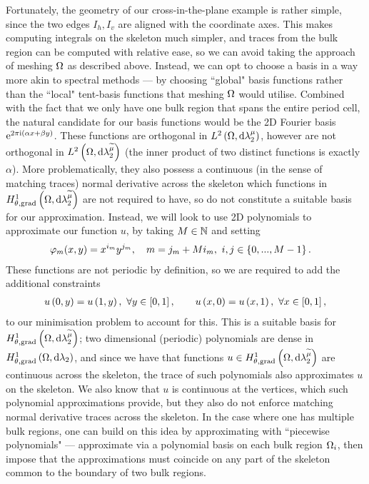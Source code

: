 Fortunately, the geometry of our cross-in-the-plane example is rather simple, since the two edges $I_h, I_v$ are aligned with the coordinate axes.
This makes computing integrals on the skeleton much simpler, and traces from the bulk region can be computed with relative ease, so we can avoid taking the approach of meshing $\Omega$ as described above.
Instead, we can opt to choose a basis in a way more akin to spectral methods --- by choosing ``global" basis functions rather than the ``local" tent-basis functions that meshing $\Omega$ would utilise.
Combined with the fact that we only have one bulk region that spans the entire period cell, the natural candidate for our basis functions would be the 2D Fourier basis $\mathrm{e}^{2\pi\mathrm{i}(\alpha x + \beta y)}$.
These functions are orthogonal in $L^{2}\left( \Omega,\mathrm{d} \lambda_2^{\mu} \right)$, however are not orthogonal in $L^{2}\left( \Omega,\mathrm{d} \lambda_2^{\widetilde{\mu}} \right)$ (the inner product of two distinct functions is exactly $\alpha$).
More problematically, they also possess a continuous (in the sense of matching traces) normal derivative across the skeleton which functions in $H^1_{\theta, \mathrm{grad}}\left( \Omega, \mathrm{d}\lambda_2^{\widetilde{\mu}} \right)$ are not required to have, so do not constitute a suitable basis for our approximation.
Instead, we will look to use 2D polynomials to approximate our function $u$, by taking $M\in\mathbb{N}$ and setting
\begin{align} \label{eq:2DPolyBasisDef}
	\varphi_m(x,y) &= x^{i_m} y^{j_m}, \quad m = j_m + Mi_m, \ i,j\in\clbracs{0,...,M-1}.
\end{align}
These functions are not periodic by definition, so we are required to add the additional constraints
\begin{align*}
	u\left( 0,y \right) = u\left( 1,y \right), \ \forall y\in\left[ 0,1 \right], 
	\qquad 
	u\left( x,0 \right) = u\left( x,1 \right), \ \forall x\in\left[ 0,1 \right],
\end{align*}
to our minimisation problem to account for this.
This is a suitable basis for $H^1_{\theta, \mathrm{grad}}\left( \Omega, \mathrm{d}\lambda_2^{\widetilde{\mu}} \right)$; two dimensional (periodic) polynomials are dense in $H^1_{\theta, \mathrm{grad}}\left( \Omega, \mathrm{d}\lambda_2 \right)$, and since we have that functions $u\in H^1_{\theta, \mathrm{grad}}\left( \Omega, \mathrm{d}\lambda_2^{\widetilde{\mu}} \right)$ are continuous across the skeleton, the trace of such polynomials also approximates $u$ on the skeleton.
We also know that $u$ is continuous at the vertices, which such polynomial approximations provide, but they also do not enforce matching normal derivative traces across the skeleton.
In the case where one has multiple bulk regions, one can build on this idea by approximating with ``piecewise polynomials" --- approximate via a polynomial basis on each bulk region $\Omega_i$, then impose that the approximations must coincide on any part of the skeleton common to the boundary of two bulk regions.

